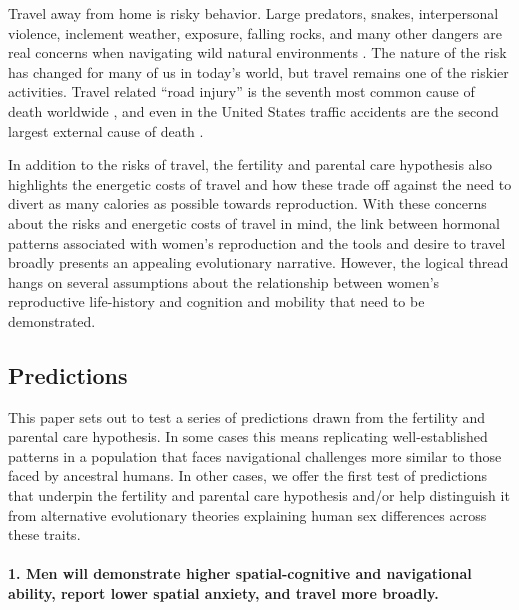 
Travel away from home is risky behavior.  Large predators, snakes, interpersonal violence, inclement weather, exposure, falling rocks, and many other dangers are real concerns when navigating wild natural environments \citep{treves1999risk, pugh1980incidence, walker2001bioarchaeological}.  The nature of the risk has changed for many of us in today's world, but travel remains one of the riskier activities.  Travel related ``road injury'' is the seventh most common cause of death worldwide \citep{krug2000global}, and even in the United States traffic accidents are the second largest external cause of death \citep{sherry2010cdc}.  

In addition to the risks of travel, the fertility and parental care hypothesis also highlights the energetic costs of travel and how these trade off against the need to divert as many calories as possible towards reproduction.  With these concerns about the risks and energetic costs of travel in mind, the link between hormonal patterns associated with women's reproduction and the tools and desire to travel broadly presents an appealing evolutionary narrative.  However, the logical thread hangs on several assumptions about the relationship between women's reproductive life-history and cognition and mobility that need to be demonstrated.

	\subsection{Predictions}
	\label{sec:1.2}
This paper sets out to test a series of predictions drawn from the fertility and parental care hypothesis.  In some cases this means replicating well-established patterns in a population that faces navigational challenges more similar to those faced by ancestral humans.  In other cases, we offer the first test of predictions that underpin the fertility and parental care hypothesis and/or help distinguish it from alternative evolutionary theories explaining human sex differences across these traits.	
	
\paragraph{1. Men will demonstrate higher spatial-cognitive and navigational ability, report lower spatial anxiety, and travel more broadly.}\mbox{}\\

